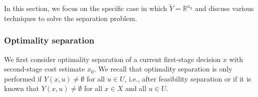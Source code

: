 In this section, we focus on the specific case in which $\tilde{Y} =
\mathbb{R}^{n_y}$ and discuss various techniques to solve the separation
problem. 

\subsubsection{Optimality separation}

We first consider optimality separation of a current first-stage decision $x$
with second-stage cost estimate $x_0$. We recall that optimality separation is
only performed if $Y(x,u) \neq \emptyset$ for all $u\in U$, i.e., after
feasibility separation or if it is known that $Y(x,u) \neq\emptyset$ for all
$x\in X$ and all $u\in U$. 


